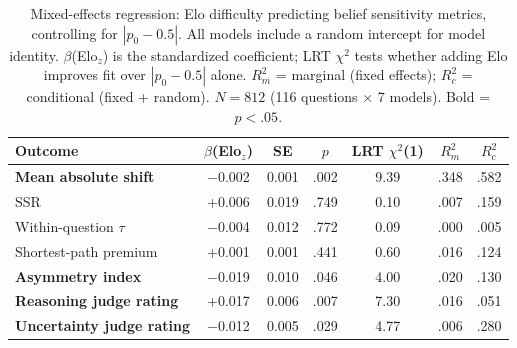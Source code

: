 \begin{table}[t]
\centering
\small
\begin{tabular}{lcccccc}
\toprule
\textbf{Outcome} & \textbf{$\beta$(Elo$_z$)} & \textbf{SE} & \textbf{$p$} & \textbf{LRT $\chi^2$(1)} & \textbf{$R^2_m$} & \textbf{$R^2_c$} \\
\midrule
\textbf{Mean absolute shift} & $-$0.002 & 0.001 & .002 & 9.39 & .348 & .582 \\
SSR & +0.006 & 0.019 & .749 & 0.10 & .007 & .159 \\
Within-question $\tau$ & $-$0.004 & 0.012 & .772 & 0.09 & .000 & .005 \\
Shortest-path premium & +0.001 & 0.001 & .441 & 0.60 & .016 & .124 \\
\textbf{Asymmetry index} & $-$0.019 & 0.010 & .046 & 4.00 & .020 & .130 \\
\textbf{Reasoning judge rating} & +0.017 & 0.006 & .007 & 7.30 & .016 & .051 \\
\textbf{Uncertainty judge rating} & $-$0.012 & 0.005 & .029 & 4.77 & .006 & .280 \\
\bottomrule
\end{tabular}
\caption{Mixed-effects regression: Elo difficulty predicting belief sensitivity metrics, controlling for $|p_0 - 0.5|$. All models include a random intercept for model identity. $\beta$(Elo$_z$) is the standardized coefficient; LRT $\chi^2$ tests whether adding Elo improves fit over $|p_0 - 0.5|$ alone. $R^2_m$ = marginal (fixed effects); $R^2_c$ = conditional (fixed + random). $N = 812$ (116 questions $\times$ 7 models). Bold = $p < .05$.}
\label{tab:elo_regression}
\end{table}